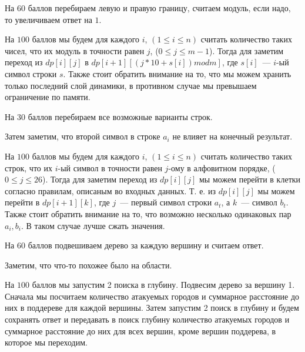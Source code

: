 \documentclass[12pt]{article}
\begin{document}

На $60$ баллов перебираем левую и правую границу, считаем модуль, если надо, то увеличиваем ответ на $1$.

На $100$ баллов мы будем для каждого $i$, $(1 \le i \le n)$ считать количество таких чисел, что их модуль в точности равен $j$, ($0 \le j \le m - 1$).
Тогда для заметим переход из $dp[i][j]$ в $dp[i + 1][(j * 10 + s[i]) mod m]$, где $s[i]$~--- $i$-ый символ строки $s$.
Также стоит обратить внимание на то, что мы можем хранить только последний слой динамики, в противном случае мы превышаем ограничение по памяти.

\EndEditorial


На $30$ баллов перебираем все возможные варианты строк.

Затем заметим, что второй символ в строке $a_i$ не влияет на конечный результат.

На $100$ баллов мы будем для каждого $i$, $(1 \le i \le n)$ считать количество таких строк, что их $i$-ый символ в точности равен $j$-ому в алфовитном порядке, ($0 \le j \le 26$).
Тогда для заметим переход из $dp[i][j]$ мы можем перейти в клетки согласно правилам, описаным во входных данных. Т. е. из $dp[i][j]$ мы можем перейти в $dp[i + 1][k]$,
где $j$~--- первый символ строки $a_t$, а $k$~--- символ $b_t$.
Также стоит обратить внимание на то, что возможно несколько одинаковых пар $a_i, b_i$. В таком случае лучше сжать значения.

\EndEditorial


На $60$ баллов подвешиваем дерево за каждую вершину и считаем ответ.

Заметим, что что-то похожее было на области.

На $100$ баллов мы запустим 2 поиска в глубину. Подвесим дерево за вершину 1.
Сначала мы посчитаем количество атакуемых городов и суммарное расстояние до них в поддереве для каждой вершины.
Затем запустим 2 поиск в глубину и будем сохранять ответ и передавать в поиск глубину количество атакуемых городов и суммарное расстояние до них для всех вершин, кроме вершин поддерева, в которое мы переходим.

\EndEditorial
\end{document}
